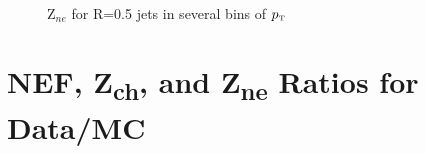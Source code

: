 \documentclass[ALICE]{ALICE_analysis_notes}
\newcommand{\pT}{$p_{\mbox{\tiny T}}$\xspace}
\begin{document}
\begin{appendix}
\begin{figure}[h!]
    \qquad
    \\
    \caption{Z$_{ne}$ for R=0.5 jets in several bins of \pT}
    \label{fig:TriggerBiasZneR05pPb}
\end{figure}

\newpage

\section{NEF, \texorpdfstring{Z\textsubscript{ch}}{Zch}, and \texorpdfstring{Z\textsubscript{ne}}{Zne} Ratios for Data/MC}
\label{sec:appendixTriggerBiasRatiospPb}




\end{appendix}
\end{document}

